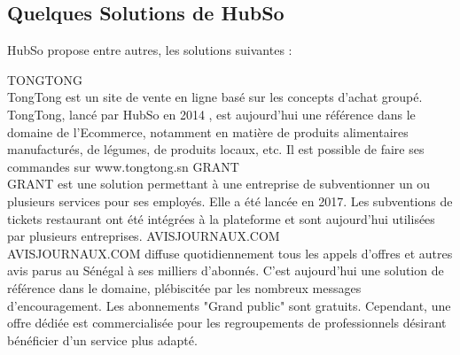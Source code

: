 \subsection{Quelques Solutions de HubSo }
HubSo propose entre autres, les solutions suivantes : 
\begin{itemize}
	\itemcheck TONGTONG \\
	TongTong est un site de vente en ligne basé sur les concepts d'achat groupé. TongTong, lancé par HubSo en 2014 , est aujourd'hui une référence dans le domaine de l'Ecommerce, notamment en matière de produits alimentaires manufacturés, de légumes, de produits locaux, etc. Il est possible de faire ses commandes sur www.tongtong.sn
	\itemcheck GRANT \\
	GRANT est une solution permettant à une entreprise de subventionner un ou plusieurs services pour ses employés. Elle a été lancée en 2017. Les subventions de tickets restaurant ont été intégrées à la plateforme et sont aujourd'hui utilisées par plusieurs entreprises.
	\itemcheck AVISJOURNAUX.COM \\
	AVISJOURNAUX.COM diffuse quotidiennement tous les appels d'offres et autres avis parus au Sénégal à ses milliers d'abonnés. C'est aujourd'hui une solution de référence dans le domaine, plébiscitée par les nombreux messages d'encouragement. Les abonnements "Grand public" sont gratuits. Cependant, une offre dédiée est commercialisée pour les regroupements de professionnels désirant bénéficier d'un service plus adapté. 
\end{itemize}

